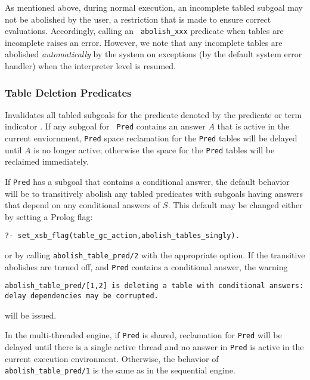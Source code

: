 \begin{description}
As mentioned above, during normal execution, an incomplete tabled
subgoal may not be abolished by the user, a restriction that is made
to ensure correct evaluations.  Accordingly, calling an {\tt
  abolish\_xxx} predicate when tables are incomplete raises an error.
However, we note that any incomplete tables are abolished
\emph{automatically} by the system on exceptions (by the default
system error handler) when the interpreter level is resumed.

\subsubsection{Table Deletion Predicates}

\begin{description}
%
Invalidates all tabled subgoals for the predicate denoted by the
predicate or term indicator .  If any subgoal for {\tt
  Pred} contains an answer $A$ that is active in the current
enviornment, {\tt Pred} space reclamation for the {\tt Pred} tables
will be delayed until $A$ is no longer active; otherwise the space for
the {\tt Pred} tables will be reclaimed immediately.  

If {\tt Pred} has a subgoal that contains a conditional answer, the
default behavior will be to transitively abolish any tabled predicates
with subgoals having answers that depend on any conditional answers of
$S$.  This default may be changed either by setting a Prolog flag:
%
\begin{verbatim}
?- set_xsb_flag(table_gc_action,abolish_tables_singly).
\end{verbatim}
% 
or by calling {\tt abolish\_table\_pred/2} with the appropriate
option.  If the transitive abolishes are turned off, and {\tt Pred}
contains a conditional answer, the warning

{\tt abolish\_table\_pred/[1,2] is deleting a table with
  conditional\ answers: \\ delay dependencies may be corrupted.}

will be issued.  

In the multi-threaded engine, if {\tt Pred} is shared, reclamation for
{\tt Pred} will be delayed until there is a single active thread and
no answer in {\tt Pred} is active in the current execution
environment.  Otherwise, the behavior of {\tt abolish\_table\_pred/1}
is the same as in the sequential engine.


\end{description}
\end{description}

